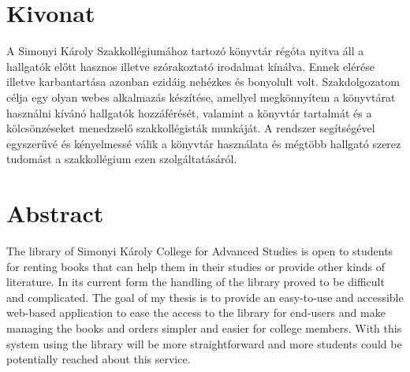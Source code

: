 \setcounter{page}{1}

\selecthungarian

\chapter*{Kivonat}

A Simonyi Károly Szakkollégiumához tartozó könyvtár régóta nyitva áll a hallgatók előtt hasznos illetve szórakoztató irodalmat kínálva.
Ennek elérése illetve karbantartása azonban ezidáig nehézkes és bonyolult volt. Szakdolgozatom célja egy olyan webes alkalmazás
készítése, amellyel megkönnyítem a könyvtárat használni kívánó hallgatók hozzáférését, valamint a könyvtár tartalmát és a kölcsönzéseket
menedzselő szakkollégisták munkáját. A rendszer segítségével egyszerűvé és kényelmessé válik a könyvtár használata és mégtöbb hallgató
szerez tudomást a szakkollégium ezen szolgáltatásáról.


\vfill
\selectenglish


\chapter*{Abstract}

The library of Simonyi Károly College for Advanced Studies is open to students for renting books that can help them in their
studies or provide other kinds of literature. In its current form the handling of the library proved to be difficult and complicated.
The goal of my thesis is to provide an easy-to-use and accessible web-based application to ease the access to the library for end-users
and make managing the books and orders simpler and easier for college members. With this system using the library will be more straightforward
and more students could be potentially reached about this service.


\vfill
\selectthesislanguage

\setcounter{romanPage}{\value{page}}
